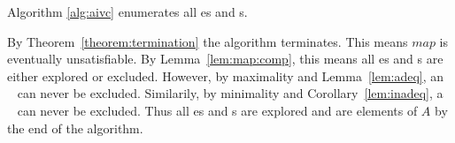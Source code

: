\begin{theorem}
\label{theorem:aivc}
  Algorithm \ref{alg:aivc} enumerates all \mis es and \mivc s.
\end{theorem}
\begin{IEEEproof}
By Theorem~\ref{theorem:termination} the algorithm terminates. This
means $map$ is eventually unsatisfiable. By Lemma~\ref{lem:map:comp},
this means all \mis es and \mivc s are either explored or excluded.
However, by maximality and Lemma~\ref{lem:adeq}, an \mis~ can never be
excluded. Similarily, by minimality and Corollary~\ref{lem:inadeq}, a
\mivc~ can never be excluded. Thus all \mis es and \mivc s are
explored and are elements of $A$ by the end of the algorithm.









%



\end{IEEEproof}
